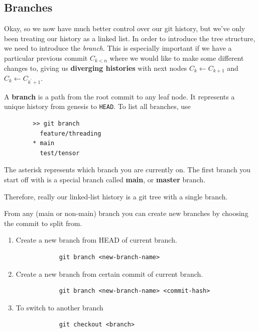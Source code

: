 \subsection{Branches} 

    Okay, so we now have much better control over our git history, but we've only been treating our history as a linked list. In order to introduce the tree structure, we need to introduce the \textit{branch}. This is especially important if we have a particular previous commit $C_{k < n}$ where we would like to make some different changes to, giving us \textbf{diverging histories} with next nodes $C_k \leftarrow C_{k+1}$ and $C_k \leftarrow C_{k^\prime + 1}$. 
    
    \begin{definition}[Branch]
      A \textbf{branch} is a path from the root commit to any leaf node. It represents a unique history from genesis to \texttt{HEAD}. To list all branches, use 
      \begin{lstlisting}
        >> git branch 
          feature/threading
        * main
          test/tensor
      \end{lstlisting} 
      The asterisk represents which branch you are currently on. The first branch you start off with is a special branch called \textbf{main}, or \textbf{master} branch. 
    \end{definition} 

    Therefore, really our linked-list history is a git tree with a single branch. 

    \begin{definition}
      From any (main or non-main) branch you can create new branches by choosing the commit to split from. 
      \begin{enumerate}
        \item Create a new branch from HEAD of current branch. 
          \begin{lstlisting}
            git branch <new-branch-name> 
          \end{lstlisting}

        \item Create a new branch from certain commit of current branch. 
          \begin{lstlisting}
            git branch <new-branch-name> <commit-hash>
          \end{lstlisting} 

        \item To switch to another branch 
          \begin{lstlisting}
            git checkout <branch> 
          \end{lstlisting}
      \end{enumerate}
    \end{definition} 

